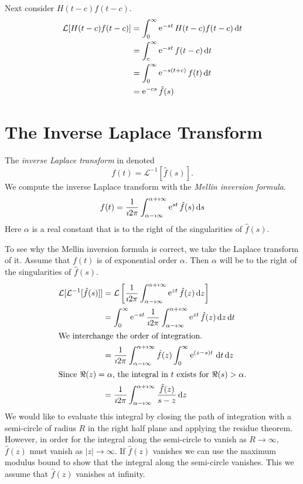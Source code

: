 \begin{Example}
  Next consider $H(t-c)f(t-c)$.
  \begin{align*}
    \mathcal{L}[H(t-c)f(t-c)]
    &= \int_0^\infty \mathop{\mathrm{e}}\nolimits^{-s t} H(t-c)f(t-c)\,\mathrm{d} t \\
    &= \int_c^\infty \mathop{\mathrm{e}}\nolimits^{-s t} f(t-c)\,\mathrm{d} t \\
    &= \int_0^\infty \mathop{\mathrm{e}}\nolimits^{-s (t+c)} f(t)\,\mathrm{d} t \\
    &= \mathop{\mathrm{e}}\nolimits^{-c s} \hat{f}(s)
  \end{align*}
\end{Example}






\section{The Inverse Laplace Transform}


The \textit{inverse Laplace transform} in denoted
\[
f(t) = \mathcal{L}^{-1}[\hat{f}(s)].
\]
We compute the inverse Laplace transform with
the \textit{Mellin inversion formula}.
\[ 
f(t) = \frac{1}{\imath 2 \pi} \int_{\alpha - \imath \infty}^{\alpha + \imath \infty} \mathop{\mathrm{e}}\nolimits^{s t} \hat{f}(s)\,\mathrm{d} s
\]
Here $\alpha$ is a real constant that is to the right of the 
singularities of $\hat{f}(s)$.

To see why the Mellin inversion formula is correct, we take the Laplace 
transform of it.  Assume that $f(t)$ is of exponential order $\alpha$.
Then $\alpha$ will be to the right of the singularities of $\hat{f}(s)$.
\begin{align*}
  \mathcal{L}[\mathcal{L}^{-1}[\hat{f}(s)]] 
  &= \mathcal{L}\left[\frac{1}{\imath 2 \pi} \int_{\alpha - \imath \infty}^{\alpha + \imath \infty} 
    \mathop{\mathrm{e}}\nolimits^{z t} \hat{f}(z)\,\mathrm{d} z \right] \\
  &= \int_0^\infty \mathop{\mathrm{e}}\nolimits^{-s t} \frac{1}{\imath 2 \pi} \int_{\alpha - \imath \infty}^{\alpha + \imath \infty} 
  \mathop{\mathrm{e}}\nolimits^{z t} \hat{f}(z)\,\mathrm{d} z\,\mathrm{d} t \\
  \intertext{We interchange the order of integration.}
  &= \frac{1}{\imath 2 \pi} \int_{\alpha - \imath \infty}^{\alpha + \imath \infty} \hat{f}(z) \int_0^\infty \mathop{\mathrm{e}}\nolimits^{(z-s)t}\,\mathrm{d} t\,\mathrm{d} z \\
  \intertext{Since $\Re(z) = \alpha$, the integral in $t$ exists for $\Re(s) > \alpha$.}
  &= \frac{1}{\imath 2 \pi} \int_{\alpha - \imath \infty}^{\alpha + \imath \infty} \frac{\hat{f}(z)}{s-z}\,\mathrm{d} z 
\end{align*}
We would like to evaluate this integral by closing the path of integration 
with a semi-circle of radius $R$ in the right half plane and applying the
residue theorem.  However, in order for the integral along the semi-circle 
to vanish as $R \to \infty$, $\hat{f}(z)$ must vanish as $|z| \to \infty$.  
If $\hat{f}(z)$ vanishes we can use the maximum modulus bound to show that 
the integral along the semi-circle vanishes.  
This we assume that $\hat{f}(z)$ vanishes at infinity.


